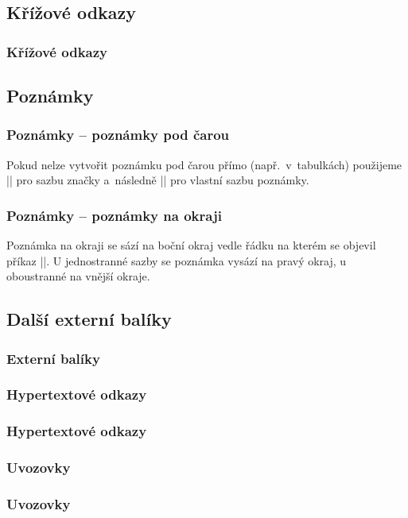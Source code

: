 \subsection{Křížové odkazy}
\begin{frame}
	\frametitle{Křížové odkazy}
\end{frame}


\subsection{Poznámky}
\begin{frame}[fragile]
	\frametitle{Poznámky -- poznámky pod čarou}
	\begin{remark}
		Pokud nelze vytvořit poznámku pod čarou přímo (např.\ v~tabulkách) použijeme |\footnotemark| pro sazbu značky a~následně || pro vlastní sazbu poznámky.
	\end{remark}
\end{frame}


\begin{frame}[fragile]
	\frametitle{Poznámky -- poznámky na okraji}
	Poznámka na okraji se sází na boční okraj vedle řádku na kterém se objevil příkaz |\marginpar|.
	U jednostranné sazby se poznámka vysází na pravý okraj, u oboustranné na vnější okraje.
\end{frame}


\subsection{Další externí balíky}
\begin{frame}
	\frametitle{Externí balíky}
\end{frame}


\subsubsection{Hypertextové odkazy}
\begin{frame}
	\frametitle{Hypertextové odkazy}
\end{frame}


\subsubsection{Uvozovky}
\begin{frame}
	\frametitle{Uvozovky}
\end{frame}


